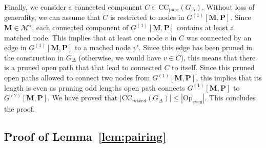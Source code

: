\documentclass{article}
\begin{document}
Finally, we consider a connected component $C\in \mathrm{CC}_{\mathrm{pure}}(G_{\Delta})$. Without loss of generality, we can assume that $C$ is restricted to nodes in  $G^{(1)}[\mathbf{M},\mathbf{P}]$. Since $\mathbf{M}\in \mathcal{M}^{\star}$,  each connected component of $G^{(1)}[\mathbf{M},\mathbf{P}]$ contains at least a matched node.  This implies that at least one node $v$ in $C$ was connected by an edge in $G^{(1)}[\mathbf{M},\mathbf{P}]$ to a mached node $v'$.  Since this edge has been pruned in the construction in $G_{\Delta}$ (otherwise, we would have  $v\in C$), this means that there is a pruned open path that that lead to connected $C$ to itself. Since this pruned open paths allowed to connect two nodes from $G^{(1)}[\mathbf{M},\mathbf{P}]$, this implies that its length is even as pruning odd lengths open path connects $G^{(1)}[\mathbf{M},\mathbf{P}]$ to $G^{(2)}[\mathbf{M},\mathbf{P}]$. We have proved that $|\mathrm{CC}_{mixed}(G_{\Delta})|\leq |\mathrm{Op}_{\mathrm{even}}|$. This concludes the proof. 



\subsection{Proof of Lemma~\ref{lem:pairing}}
\end{document}
